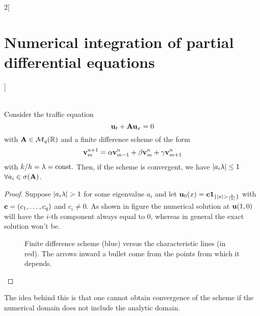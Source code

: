 \documentclass[../../../main_math.tex]{subfiles}
\begin{document}
\begin{multicols}{2}[\section{Numerical integration of partial differential equations}]
\begin{sproof}
\begin{align*}
    \end{align*}
  \end{sproof}
  \begin{theorem}
    Consider the traffic equation $$\boldsymbol{\mathrm{u}}_t+\boldsymbol{\mathrm{A}}\boldsymbol{\mathrm{u}}_x=0$$ with $\boldsymbol{\mathrm{A}}\in\mathcal{M}_q(\mathbb{R})$ and a finite difference scheme of the form $$\boldsymbol{\mathrm{v}}_m^{n+1}=\alpha \boldsymbol{\mathrm{v}}_{m-1}^n+\beta \boldsymbol{\mathrm{v}}_m^n+\gamma \boldsymbol{\mathrm{v}}_{m+1}^n$$ with $k/h=\lambda=\text{const.}$ Then, if the scheme is convergent, we have $\abs{a_i\lambda}\leq 1$ $\forall a_i\in\sigma(\boldsymbol{\mathrm{A}})$.
  \end{theorem}
  \begin{proof}
    Suppose $\abs{a_i\lambda}>1$ for some eigenvalue $a_i$ and let $\boldsymbol{\mathrm{u}}_0(x)=\boldsymbol{\mathrm{c}}\boldsymbol{\mathrm{1}}_{\{\abs{x}> \frac{1}{\abs{\lambda}}\}}$ with $\boldsymbol{\mathrm{c}}=(c_1,\ldots,c_q)$ and $c_i\ne 0$. As shown in figure  the numerical solution at $\boldsymbol{\mathrm{u}}(1,0)$ will have the $i$-th component always equal to 0, whereas in general the exact solution won't be.
    \begin{figure}[H]
      \centering
      
      \caption{Finite difference scheme (blue) versus the characteristic lines (in red). The arrows inward a bullet come from the points from which it depends.}
      \label{NIPDE:courant-friedrichs-lewy_fig}
    \end{figure}
  \end{proof}
  \begin{remark}
    The idea behind this is that one cannot obtain convergence of the scheme if the numerical domain does not include the analytic domain.
  \end{remark}

\end{multicols}
\end{document}
